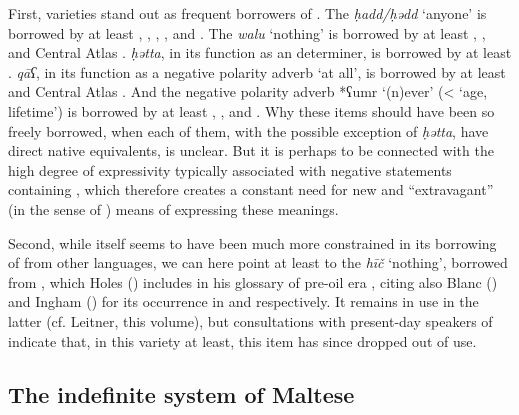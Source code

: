 \documentclass[output=paper]{langsci/langscibook}
\begin{document}
First,  varieties stand out as frequent borrowers of   . The  \textit{ḥadd/ḥədd} ‘anyone’ is borrowed by at least  \citep[58]{Souag2009}, , ,  \citep[29]{Rabhi1996}, and  \citep[41]{Boumalk1996}. The  \textit{walu} ‘nothing’ is borrowed by at least  \citep[54]{Lafkioui1996}, , and {Central} Atlas  \citep[41]{Boumalk1996}. \textit{ḥətta}, in its function as an  determiner, is borrowed by at least  \citep[41]{Boumalk1996}. \textit{qāʕ}, in its function as a negative polarity adverb ‘at all’, is borrowed by at least  and {Central} Atlas  \citep[42]{Boumalk1996}. And the negative polarity adverb *ʕumr ‘(n)ever’ (< ‘age, lifetime’) is borrowed by at least ,  \citep[30]{Rabhi1996}, and  \citep[72]{Lafkioui1996}. Why these items should have been so freely borrowed, when each of them, with the possible exception of \textit{ḥətta}, have direct native equivalents, is unclear. But it is perhaps to be connected with the high degree of expressivity typically associated with negative statements containing , which therefore creates a constant need for new and “extravagant” (in the sense of \citealt{Haspelmath2000}) means of expressing these meanings.

Second, while  itself seems to have been much more constrained in its borrowing of  from other languages, we can here point at least to the  \textit{hīč} ‘nothing’, borrowed from , which Holes (\citeyear[549]{Holes2001}) includes in his glossary of pre-oil era  , citing also Blanc (\citeyear[159]{Blanc1964}) and Ingham (\citeyear[547]{Ingham1973}) for its occurrence in  and   respectively. It remains in use in the latter (cf. Leitner, this volume), but consultations with present-day speakers of   indicate that, in this variety at least, this item has since dropped out of use.



\subsection{The indefinite system of Maltese}
\end{document}
